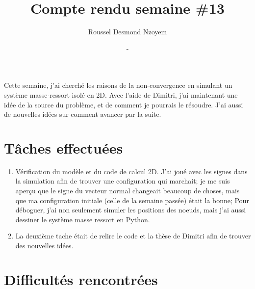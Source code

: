 \documentclass[
  french,
	11pt, %
]{fphw}
\title{\sf\bfseries Compte rendu semaine \#13} %
\author{Roussel Desmond Nzoyem} %
\date{\DTMdisplaydate{2021}{4}{28}{-1} - \DTMdisplaydate{2021}{5}{3}{-1}} %
\institute{Sorbonne Université \\ Laboratoire Jacques-Louis Lions} %
\begin{document}
\maketitle %


Cette semaine, j'ai cherché les raisons de la non-convergence en simulant un système masse-ressort isolé en 2D. Avec l'aide de Dimitri, j'ai maintenant une idée de la source du problème, et de comment je pourrais le résoudre. J'ai aussi de nouvelles idées sur comment avancer par la suite.





\section*{Tâches effectuées}

\begin{enumerate}
  \item Vérification du modèle et du code de calcul 2D. J'ai joué avec les signes dans la simulation afin de trouver une configuration qui marchait; je me suis aperçu que le signe du vecteur normal changeait beaucoup de choses, mais que ma configuration initiale (celle de la semaine passée) était la bonne; Pour déboguer, j'ai non seulement simuler les positions des noeuds, mais j'ai aussi dessiner le système masse ressort en Python.
  \item La deuxième tache était de relire le code et la thèse de Dimitri afin de trouver des nouvelles idées.
\end{enumerate}



\section*{Difficultés rencontrées}
\end{document}
